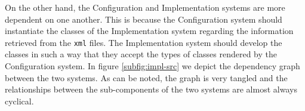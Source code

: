 \noindent On the other hand, the Configuration and Implementation systems are more dependent on one another. This is because the Configuration system should instantiate the classes of the Implementation system regarding the information retrieved from the \verb!xml! files. The Implementation system should develop the classes in such a way that they accept the types of classes rendered by the Configuration system. In figure \ref{subfig:impl-src} we depict the dependency graph between the two systems. As can be noted, the graph is very tangled and the relationships between the sub-components of the two systems are almost always cyclical.
\begin{figure}
    \centering
    \hfill
    \centering
\end{figure}
